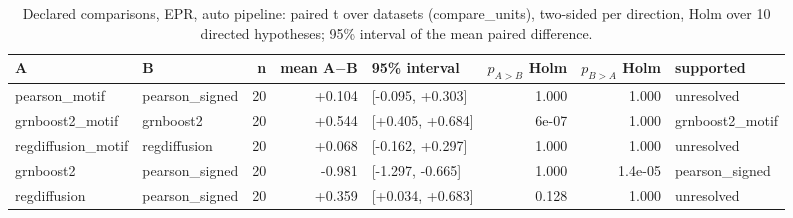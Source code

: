 \begin{table}[H]\centering\small
\caption{Declared comparisons, EPR, auto pipeline: paired t over datasets (compare\_units), two-sided per direction, Holm over 10 directed hypotheses; 95\% interval of the mean paired difference.}
\begin{tabular}{llrrlrrl}\toprule
A & B & n & mean A$-$B & 95\% interval & $p_{A>B}$ Holm & $p_{B>A}$ Holm & supported \\ \midrule
pearson\_motif & pearson\_signed & 20 & +0.104 & [-0.095, +0.303] & 1.000 & 1.000 & unresolved \\
grnboost2\_motif & grnboost2 & 20 & +0.544 & [+0.405, +0.684] & 6e-07 & 1.000 & grnboost2\_motif \\
regdiffusion\_motif & regdiffusion & 20 & +0.068 & [-0.162, +0.297] & 1.000 & 1.000 & unresolved \\
grnboost2 & pearson\_signed & 20 & -0.981 & [-1.297, -0.665] & 1.000 & 1.4e-05 & pearson\_signed \\
regdiffusion & pearson\_signed & 20 & +0.359 & [+0.034, +0.683] & 0.128 & 1.000 & unresolved \\
\bottomrule\end{tabular}\end{table}
